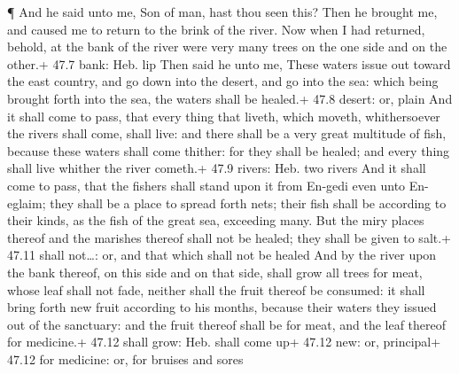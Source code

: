  ¶ And he said unto me, Son of man, hast thou seen this?
Then he brought me, and caused me to return to the brink of the river.
 Now when I had returned, behold, at the bank of the river
were very many trees on the one side and on the other.+ 47.7 bank: Heb.
lip  Then said he unto me, These waters issue out toward the
east country, and go down into the desert, and go into the sea: which
being brought forth into the sea, the waters shall be healed.+ 47.8
desert: or, plain  And it shall come to pass, that every
thing that liveth, which moveth, whithersoever the rivers shall come,
shall live: and there shall be a very great multitude of fish, because
these waters shall come thither: for they shall be healed; and every
thing shall live whither the river cometh.+ 47.9 rivers: Heb. two rivers
 And it shall come to pass, that the fishers shall stand
upon it from En-gedi even unto En-eglaim; they shall be a place to
spread forth nets; their fish shall be according to their kinds, as the
fish of the great sea, exceeding many.  But the miry places
thereof and the marishes thereof shall not be healed; they shall be
given to salt.+ 47.11 shall not\ldots: or, and that which shall not be
healed  And by the river upon the bank thereof, on this
side and on that side, shall grow all trees for meat, whose leaf shall
not fade, neither shall the fruit thereof be consumed: it shall bring
forth new fruit according to his months, because their waters they
issued out of the sanctuary: and the fruit thereof shall be for meat,
and the leaf thereof for medicine.+ 47.12 shall grow: Heb. shall come
up+ 47.12 new: or, principal+ 47.12 for medicine: or, for bruises and
sores

